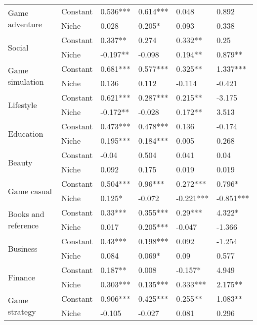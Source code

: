 \begin{table}[h!]
\begin{tabular}{llllll}
\cline{1-6}
\multirow{2}{*}{Game adventure} & Constant &  0.536*** &  0.614*** &  0.048 &  0.892 \\
          & Niche &  0.028 &  0.205* &  0.093 &  0.338 \\
\cline{1-6}
\multirow{2}{*}{Social} & Constant &  0.337** &  0.274 &  0.332** &  0.25 \\
          & Niche &  -0.197** &  -0.098 &  0.194** &  0.879** \\
\cline{1-6}
\multirow{2}{*}{Game simulation} & Constant &  0.681*** &  0.577*** &  0.325** &  1.337*** \\
          & Niche &  0.136 &  0.112 &  -0.114 &  -0.421 \\
\cline{1-6}
\multirow{2}{*}{Lifestyle} & Constant &  0.621*** &  0.287*** &  0.215** &  -3.175 \\
          & Niche &  -0.172** &  -0.028 &  0.172** &  3.513 \\
\cline{1-6}
\multirow{2}{*}{Education} & Constant &  0.473*** &  0.478*** &  0.136 &  -0.174 \\
          & Niche &  0.195*** &  0.184*** &  0.005 &  0.268 \\
\cline{1-6}
\multirow{2}{*}{Beauty} & Constant &  -0.04 &  0.504 &  0.041 &  0.04 \\
          & Niche &  0.092 &  0.175 &  0.019 &  0.019 \\
\cline{1-6}
\multirow{2}{*}{Game casual} & Constant &  0.504*** &  0.96*** &  0.272*** &  0.796* \\
          & Niche &  0.125* &  -0.072 &  -0.221*** &  -0.851*** \\
\cline{1-6}
\multirow{2}{*}{Books and reference} & Constant &  0.33*** &  0.355*** &  0.29*** &  4.322* \\
          & Niche &  0.017 &  0.205*** &  -0.047 &  -1.366 \\
\cline{1-6}
\multirow{2}{*}{Business} & Constant &  0.43*** &  0.198*** &  0.092 &  -1.254 \\
          & Niche &  0.084 &  0.069* &  0.09 &  0.577 \\
\cline{1-6}
\multirow{2}{*}{Finance} & Constant &  0.187** &  0.008 &  -0.157* &  4.949 \\
          & Niche &  0.303*** &  0.135*** &  0.333*** &  2.175** \\
\cline{1-6}
\multirow{2}{*}{Game strategy} & Constant &  0.906*** &  0.425*** &  0.255** &  1.083** \\
          & Niche &  -0.105 &  -0.027 &  0.081 &  0.296 \\

\end{tabular}
\end{table}

